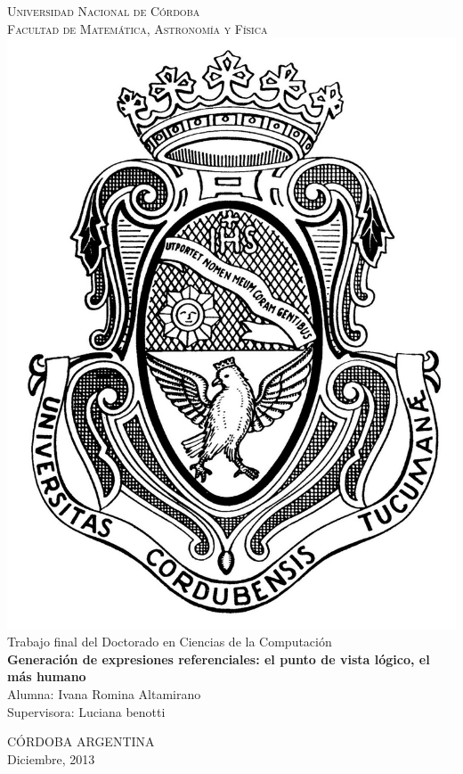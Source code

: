 \thispagestyle{empty}

\begin{titlepage}
\begin{center}

{ \vspace*{1cm} }
\huge{\textsc{\textmd{Universidad Nacional de C\'ordoba}}}\\[1cm]
\Large{\textsc{\textmd{Facultad de Matem\'atica, Astronom\'ia y F\'isica}}}\\[1cm]

\includegraphics[scale=0.1]{preliminar/unc}\\[1.3cm]

\Large{Trabajo final del Doctorado en Ciencias de la Computaci\'on}\\[1cm]

\LARGE{\textbf{Generaci\'on de expresiones referenciales: el punto de vista l\'ogico, el m\'as humano }}\\[2cm]

\Large{Alumna: Ivana Romina Altamirano}\\[1.3cm]

\Large{Supervisora: Luciana benotti}

\vfill
\vfill

\large{C\'ORDOBA } \large{ARGENTINA}\\ 
\large{Diciembre, 2013}


\end{center}
\end{titlepage}
